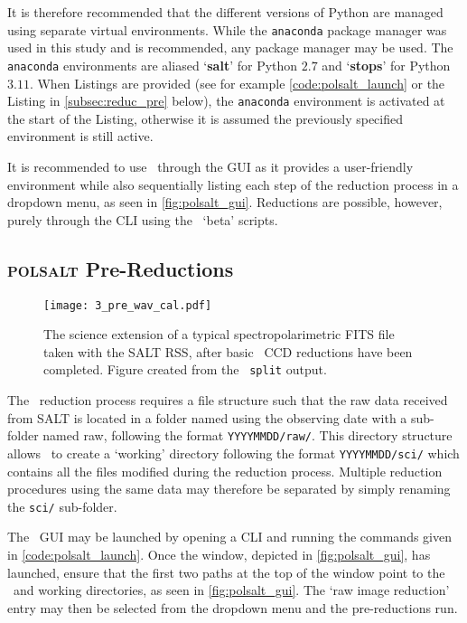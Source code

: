 It is therefore recommended that the different versions of Python are managed using separate virtual environments. While the \texttt{anaconda} package manager was used in this study and is recommended, any package manager may be used. The \texttt{anaconda} environments are aliased `\textbf{salt}' for Python $2.7$ and `\textbf{stops}' for Python $3.11$. When Listings are provided (see for example \autoref{code:polsalt_launch} or the Listing in \autoref{subsec:reduc_pre} below), the \texttt{anaconda} environment is activated at the start of the Listing, otherwise it is assumed the previously specified environment is still active.

It is recommended to use \polsalt\ through the \gls{GUI} as it provides a user-friendly environment while also sequentially listing each step of the reduction process in a dropdown menu, as seen in \autoref{fig:polsalt_gui}. Reductions are possible, however, purely through the \gls{CLI} using the \polsalt\ `beta' scripts.

\subsection{\textsc{polsalt} Pre-Reductions} \label{subsec:reduc_pre}

\begin{figure}[t]
    \centering
    \texttt{[image: 3\_pre\_wav\_cal.pdf]}
    \caption{The science extension of a typical spectropolarimetric \acs{FITS} file taken with the \gls{SALT} \gls{RSS}, after basic \polsalt\ \gls{CCD} reductions have been completed. Figure created from the \stops\ \texttt{split} output.}
    \label{fig:polsalt_pre_wav_cal}
\end{figure}

The \polsalt\ reduction process requires a file structure such that the raw data received from \gls{SALT} is located in a folder named using the observing date with a sub-folder named raw, following the format \texttt{YYYYMMDD/raw/}. This directory structure allows \polsalt\ to create a `working' directory following the format \texttt{YYYYMMDD/sci/} which contains all the files modified during the reduction process. Multiple reduction procedures using the same data may therefore be separated by simply renaming the \texttt{sci/} sub-folder.

The \polsalt\ \gls{GUI} may be launched by opening a \gls{CLI} and running the commands given in \autoref{code:polsalt_launch}. Once the window, depicted in \autoref{fig:polsalt_gui}, has launched, ensure that the first two paths at the top of the window point to the \polsalt\ and working directories, as seen in \autoref{fig:polsalt_gui}. The `raw image reduction' entry may then be selected from the dropdown menu and the pre-reductions run.

